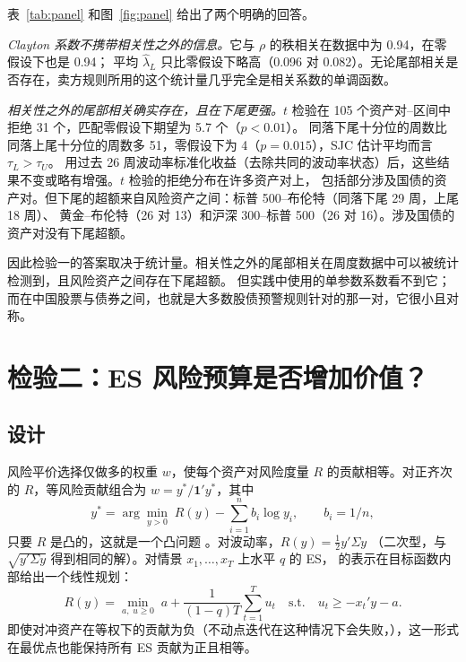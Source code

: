 \documentclass[11pt,UTF8]{ctexart}
\newcommand{\1}{\mathbf{1}}
\begin{document}
表~\ref{tab:panel} 和图~\ref{fig:panel} 给出了两个明确的回答。

\emph{Clayton 系数不携带相关性之外的信息。}它与 $\rho$ 的秩相关在数据中为 0.94，在零假设下也是 0.94；
平均 $\hat\lambda_L$ 只比零假设下略高（0.096 对 0.082）。无论尾部相关是否存在，卖方规则所用的这个统计量几乎完全是相关系数的单调函数。

\emph{相关性之外的尾部相关确实存在，且在下尾更强。}$t$ 检验在 105 个资产对--区间中拒绝 31 个，匹配零假设下期望为 5.7 个（$p<0.01$）。
同落下尾十分位的周数比同落上尾十分位的周数多 51，零假设下为 4（$p=0.015$），SJC 估计平均而言 $\tau_L>\tau_U$。
用过去 26 周波动率标准化收益（去除共同的波动率状态）后，这些结果不变或略有增强。$t$ 检验的拒绝分布在许多资产对上，
包括部分涉及国债的资产对。但下尾的超额来自风险资产之间：标普 500--布伦特（同落下尾 29 周，上尾 18 周）、
黄金--布伦特（26 对 13）和沪深 300--标普 500（26 对 16）。涉及国债的资产对没有下尾超额。

因此检验一的答案取决于统计量。相关性之外的尾部相关在周度数据中可以被统计检测到，且风险资产之间存在下尾超额。
但实践中使用的单参数系数看不到它；而在中国股票与债券之间，也就是大多数股债预警规则针对的那一对，它很小且对称。

\section{检验二：ES 风险预算是否增加价值？}
\label{sec:test2}

\subsection{设计}

风险平价选择仅做多的权重 $w$，使每个资产对风险度量 $R$ 的贡献相等。对正齐次的 $R$，等风险贡献组合为 $w=y^*/\mathbf{1}'y^*$，其中
\begin{equation}
y^* = \arg\min_{y>0}\; R(y) - \sum_{i=1}^{n} b_i\log y_i ,\qquad b_i = 1/n,
\end{equation}
只要 $R$ 是凸的，这就是一个凸问题 \citep{spinu2013,maillard2010}。对波动率，$R(y)=\tfrac12 y'\Sigma y$
（二次型，与 $\sqrt{y'\Sigma y}$ 得到相同的解）。对情景 $x_1,\dots,x_T$ 上水平 $q$ 的 ES，
\citet{rockafellar2000} 的表示在目标函数内部给出一个线性规划：
\begin{equation}
R(y) = \min_{a,\;u\ge 0}\; a + \frac{1}{(1-q)T}\sum_{t=1}^{T}u_t \quad\text{s.t.}\quad u_t\ge -x_t'y - a .
\end{equation}
即使对冲资产在等权下的贡献为负（不动点迭代在这种情况下会失败，\citealp{mausser2018}），这一形式在最优点也能保持所有 ES 贡献为正且相等。
\end{document}
